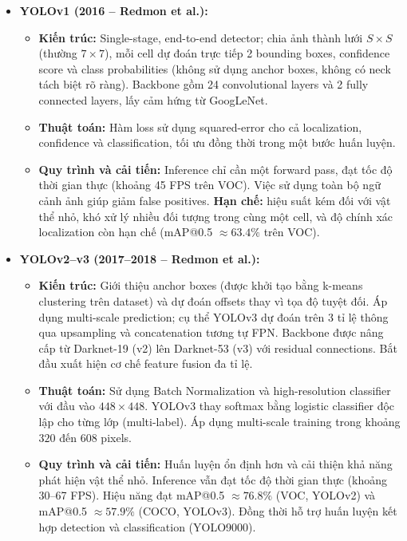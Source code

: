 \begin{itemize}
	\item \textbf{YOLOv1 (2016 -- Redmon et al.):}
	\begin{itemize}
		\item \textbf{Kiến trúc:} Single-stage, end-to-end detector; chia ảnh thành lưới $S \times S$ (thường $7 \times 7$), mỗi cell dự đoán trực tiếp 2 bounding boxes, confidence score và class probabilities (không sử dụng anchor boxes, không có neck tách biệt rõ ràng). Backbone gồm 24 convolutional layers và 2 fully connected layers, lấy cảm hứng từ GoogLeNet.
		
		\item \textbf{Thuật toán:} Hàm loss sử dụng squared-error cho cả localization, confidence và classification, tối ưu đồng thời trong một bước huấn luyện.
		
		\item \textbf{Quy trình và cải tiến:} Inference chỉ cần một forward pass, đạt tốc độ thời gian thực (khoảng 45 FPS trên VOC). Việc sử dụng toàn bộ ngữ cảnh ảnh giúp giảm false positives. \textbf{Hạn chế:} hiệu suất kém đối với vật thể nhỏ, khó xử lý nhiều đối tượng trong cùng một cell, và độ chính xác localization còn hạn chế (mAP@0.5 $\approx 63.4\%$ trên VOC).
	\end{itemize}
	
	\item \textbf{YOLOv2--v3 (2017--2018 -- Redmon et al.):}
	\begin{itemize}
		\item \textbf{Kiến trúc:} Giới thiệu anchor boxes (được khởi tạo bằng k-means clustering trên dataset) và dự đoán offsets thay vì tọa độ tuyệt đối. Áp dụng multi-scale prediction; cụ thể YOLOv3 dự đoán trên 3 tỉ lệ thông qua upsampling và concatenation tương tự FPN. Backbone được nâng cấp từ Darknet-19 (v2) lên Darknet-53 (v3) với residual connections. Bắt đầu xuất hiện cơ chế feature fusion đa tỉ lệ.
		
		\item \textbf{Thuật toán:} Sử dụng Batch Normalization và high-resolution classifier với đầu vào $448 \times 448$. YOLOv3 thay softmax bằng logistic classifier độc lập cho từng lớp (multi-label). Áp dụng multi-scale training trong khoảng $320$ đến $608$ pixels.
		
		\item \textbf{Quy trình và cải tiến:} Huấn luyện ổn định hơn và cải thiện khả năng phát hiện vật thể nhỏ. Inference vẫn đạt tốc độ thời gian thực (khoảng 30--67 FPS). Hiệu năng đạt mAP@0.5 $\approx 76.8\%$ (VOC, YOLOv2) và mAP@0.5 $\approx 57.9\%$ (COCO, YOLOv3). Đồng thời hỗ trợ huấn luyện kết hợp detection và classification (YOLO9000).
	\end{itemize}
	

\end{itemize}
